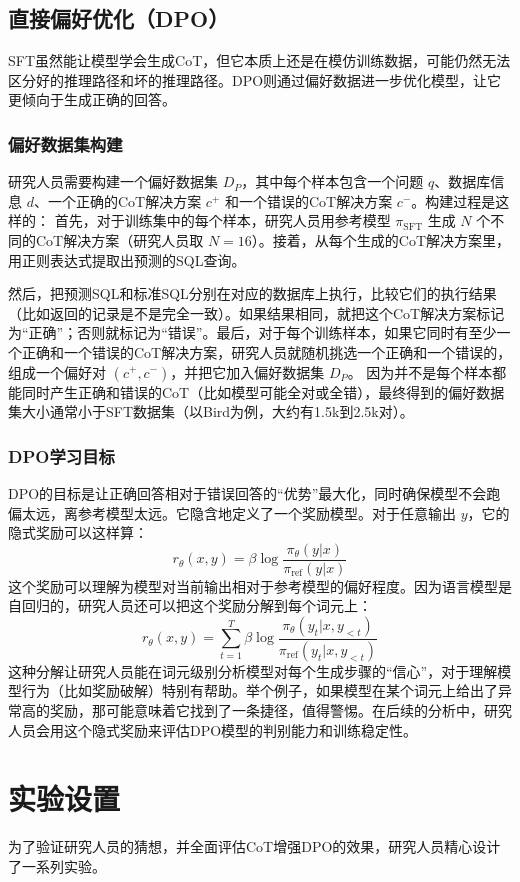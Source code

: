\subsection{直接偏好优化（DPO）}
SFT虽然能让模型学会生成CoT，但它本质上还是在模仿训练数据，可能仍然无法区分好的推理路径和坏的推理路径。DPO则通过偏好数据进一步优化模型，让它更倾向于生成正确的回答。

\subsubsection{偏好数据集构建}
研究人员需要构建一个偏好数据集 \(D_P\)，其中每个样本包含一个问题 \(q\)、数据库信息 \(d\)、一个正确的CoT解决方案 \(c^+\) 和一个错误的CoT解决方案 \(c^-\)。构建过程是这样的：
首先，对于训练集中的每个样本，研究人员用参考模型 \(\pi_{\mathrm{SFT}}\) 生成 \(N\) 个不同的CoT解决方案（研究人员取 \(N=16\)）。接着，从每个生成的CoT解决方案里，用正则表达式提取出预测的SQL查询。

然后，把预测SQL和标准SQL分别在对应的数据库上执行，比较它们的执行结果（比如返回的记录是不是完全一致）。如果结果相同，就把这个CoT解决方案标记为“正确”；否则就标记为“错误”。最后，对于每个训练样本，如果它同时有至少一个正确和一个错误的CoT解决方案，研究人员就随机挑选一个正确和一个错误的，组成一个偏好对 \((c^+, c^-)\)，并把它加入偏好数据集 \(D_P\)。
因为并不是每个样本都能同时产生正确和错误的CoT（比如模型可能全对或全错），最终得到的偏好数据集大小通常小于SFT数据集（以Bird为例，大约有1.5k到2.5k对）。

\subsubsection{DPO学习目标}
DPO的目标是让正确回答相对于错误回答的“优势”最大化，同时确保模型不会跑偏太远，离参考模型太远。它隐含地定义了一个奖励模型。对于任意输出 \(y\)，它的隐式奖励可以这样算：
\[
r_{\theta}(x,y) = \beta \log \frac{\pi_{\theta}(y|x)}{\pi_{\mathrm{ref}}(y|x)}
\]
这个奖励可以理解为模型对当前输出相对于参考模型的偏好程度。因为语言模型是自回归的，研究人员还可以把这个奖励分解到每个词元上：
\[
r_{\theta}(x,y) = \sum_{t=1}^{T} \beta \log \frac{\pi_{\theta}(y_t|x,y_{<t})}{\pi_{\mathrm{ref}}(y_t|x,y_{<t})}
\]
这种分解让研究人员能在词元级别分析模型对每个生成步骤的“信心”，对于理解模型行为（比如奖励破解）特别有帮助。举个例子，如果模型在某个词元上给出了异常高的奖励，那可能意味着它找到了一条捷径，值得警惕。在后续的分析中，研究人员会用这个隐式奖励来评估DPO模型的判别能力和训练稳定性。

\section{实验设置}
为了验证研究人员的猜想，并全面评估CoT增强DPO的效果，研究人员精心设计了一系列实验。

